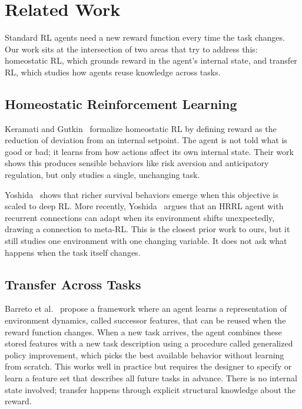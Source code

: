 \documentclass[sigplan,10pt]{acmart}
\begin{document}
\section{Related Work}

Standard RL agents need a new reward function every time the task
changes. Our work sits at the intersection of two areas that try to
address this: homeostatic RL, which grounds reward in the agent's
internal state, and transfer RL, which studies how agents reuse
knowledge across tasks.

\subsection{Homeostatic Reinforcement Learning}

Keramati and Gutkin~\cite{keramati2014} formalize homeostatic RL by
defining reward as the reduction of deviation from an internal setpoint.
The agent is not told what is good or bad; it learns from how actions
affect its own internal state. Their work shows this produces sensible
behaviors like risk aversion and anticipatory regulation, but only
studies a single, unchanging task.

Yoshida~\cite{yoshida2018} shows that richer survival behaviors
emerge when this objective is scaled to deep RL. More recently,
Yoshida~\cite{Yoshida} argues that an HRRL agent with recurrent
connections can adapt when its environment shifts unexpectedly, drawing
a connection to meta-RL. This is the closest prior work to ours, but it
still studies one environment with one changing variable. It does not
ask what happens when the task itself changes.

\subsection{Transfer Across Tasks}

Barreto et al.~\cite{Barreto} propose a framework where an agent
learns a representation of environment dynamics, called successor
features, that can be reused when the reward function changes. When
a new task arrives, the agent combines these stored features with a
new task description using a procedure called generalized policy
improvement, which picks the best available behavior without learning
from scratch. This works well in practice but requires the designer to
specify or learn a feature set that describes all future tasks in
advance. There is no internal state involved; transfer happens
through explicit structural knowledge about the reward.
\end{document}
